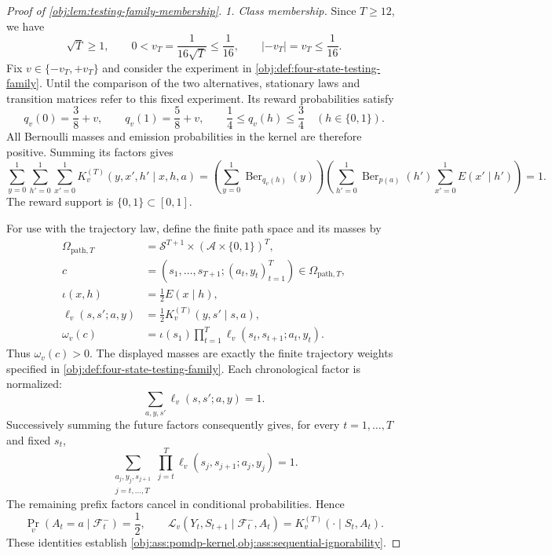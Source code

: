 \begin{proof}[Proof of \cref{obj:lem:testing-family-membership}]
\emph{1. Class membership.}
Since \(T\geq12\), we have
\[
\sqrt T\geq1,\qquad
0<v_T=\frac{1}{16\sqrt T}\leq\frac1{16},
\qquad
|-v_T|=v_T\leq\frac1{16}.
\]
Fix \(v\in\{-v_T,+v_T\}\) and consider the experiment in
\cref{obj:def:four-state-testing-family}. Until the comparison of the two alternatives, stationary laws and transition matrices refer to this fixed experiment. Its reward probabilities satisfy
\[
q_v(0)=\frac38+v,\qquad q_v(1)=\frac58+v,
\qquad
\frac14\leq q_v(h)\leq\frac34
\quad(h\in\{0,1\}).
\]
All Bernoulli masses and emission probabilities in the kernel are therefore positive. Summing its factors gives
\[
\sum_{y=0}^1\sum_{h'=0}^1\sum_{x'=0}^1
K_v^{(T)}(y,x',h'\mid x,h,a)
=
\left(\sum_{y=0}^1\operatorname{Ber}_{q_v(h)}(y)\right)
\left(\sum_{h'=0}^1\operatorname{Ber}_{p(a)}(h')
      \sum_{x'=0}^1E(x'\mid h')\right)
=1.
\]
The reward support is \(\{0,1\}\subset[0,1]\).

For use with the trajectory law, define the finite path space and its masses by
\[
\begin{aligned}
\Omega_{\mathrm{path},T}
&=\mathcal S^{T+1}\times(\mathcal A\times\{0,1\})^T,\\
c&=(s_1,\ldots,s_{T+1};(a_t,y_t)_{t=1}^T)
   \in\Omega_{\mathrm{path},T},\\
\iota(x,h)&=\frac12E(x\mid h),\\
\ell_v(s,s';a,y)&=\frac12K_v^{(T)}(y,s'\mid s,a),\\
\omega_v(c)&=\iota(s_1)\prod_{t=1}^T
                     \ell_v(s_t,s_{t+1};a_t,y_t).
\end{aligned}
\]
Thus \(\omega_v(c)>0\). The displayed masses are exactly the finite trajectory weights specified in
\cref{obj:def:four-state-testing-family}. Each chronological factor is normalized:
\[
\sum_{a,y,s'}\ell_v(s,s';a,y)=1.
\]
Successively summing the future factors consequently gives, for every \(t=1,\ldots,T\) and fixed \(s_t\),
\[
\sum_{\substack{a_j,y_j,s_{j+1}\\j=t,\ldots,T}}
\prod_{j=t}^T\ell_v(s_j,s_{j+1};a_j,y_j)=1.
\]
The remaining prefix factors cancel in conditional probabilities. Hence
\[
\Pr_v(A_t=a\mid\mathcal F_t^-)=\frac12,
\qquad
\mathcal L_v(Y_t,S_{t+1}\mid\mathcal F_t^-,A_t)
=K_v^{(T)}(\cdot\mid S_t,A_t).
\]
These identities establish
\cref{obj:ass:pomdp-kernel,obj:ass:sequential-ignorability}.


\end{proof}
